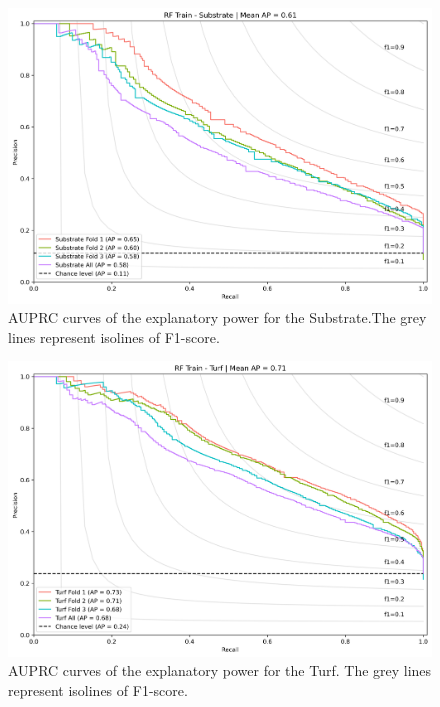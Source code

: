 \begin{figure}
\hypertarget{fig:chap3figS34}{%
\centering
\includegraphics{03-Chapitre3/figures/supplementary/03-precision_recall_curve_train_rf_Substrate.png}
\caption{AUPRC curves of the explanatory power for the Substrate.The
grey lines represent isolines of F1-score.}\label{fig:chap3figS34}
}
\end{figure}

\begin{figure}
\hypertarget{fig:chap3figS35}{%
\centering
\includegraphics{03-Chapitre3/figures/supplementary/03-precision_recall_curve_train_rf_Turf.png}
\caption{AUPRC curves of the explanatory power for the Turf. The grey
lines represent isolines of F1-score.}\label{fig:chap3figS35}
}
\end{figure}

\clearpage

